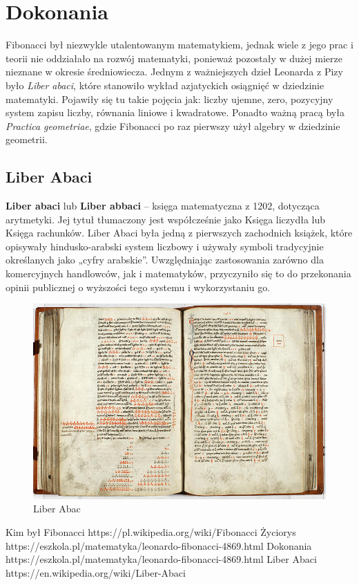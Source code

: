 \documentclass{report}
\begin{document}
\section{Dokonania}
\cite{fib3}
Fibonacci był niezwykle utalentowanym matematykiem, jednak wiele z jego prac i teorii nie oddziałało na rozwój matematyki, ponieważ pozostały w dużej mierze nieznane w okresie średniowiecza.
Jednym z ważniejszych dzieł Leonarda z Pizy było \textit{Liber abaci}, które stanowiło wykład azjatyckich osiągnięć w dziedzinie matematyki. Pojawiły się tu takie pojęcia jak: liczby ujemne, zero, pozycyjny system zapisu liczby, równania liniowe i kwadratowe.
Ponadto ważną pracą była \textit{Practica geometriae}, gdzie Fibonacci po raz pierwszy użył algebry w dziedzinie geometrii.
\subsection{Liber Abaci}
\cite{fib4}
\textbf{Liber abaci} lub \textbf{Liber abbaci} – księga matematyczna z 1202, dotycząca arytmetyki. Jej tytuł tłumaczony jest współcześnie jako Księga liczydła lub Księga rachunków. Liber Abaci była jedną z pierwszych zachodnich książek, które opisywały hindusko-arabski system liczbowy i używały symboli tradycyjnie określanych jako „cyfry arabskie”. Uwzględniając zastosowania zarówno dla komercyjnych handlowców, jak i matematyków, przyczyniło się to do przekonania opinii publicznej o wyższości tego systemu i wykorzystaniu go.
\begin{figure}[h]
\center
\includegraphics[scale=0.6]{liberabaci3}
\caption{Liber Abac}
\end{figure}
\newpage
\begin{thebibliography}{9}
 Kim był Fibonacci https://pl.wikipedia.org/wiki/Fibonacci
 Życiorys https://eszkola.pl/matematyka/leonardo-fibonacci-4869.html
 Dokonania https://eszkola.pl/matematyka/leonardo-fibonacci-4869.html
 Liber Abaci https://en.wikipedia.org/wiki/Liber-Abaci

\end{thebibliography}
\end{document}

